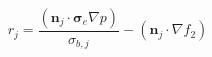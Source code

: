 $$
r_j = \frac{\left(\mathbf n_j\cdot\boldsymbol\sigma_e\nabla p\right)}{\sigma_{b,j}} - \left(\mathbf n_j\cdot\nabla f_2\right)
$$
